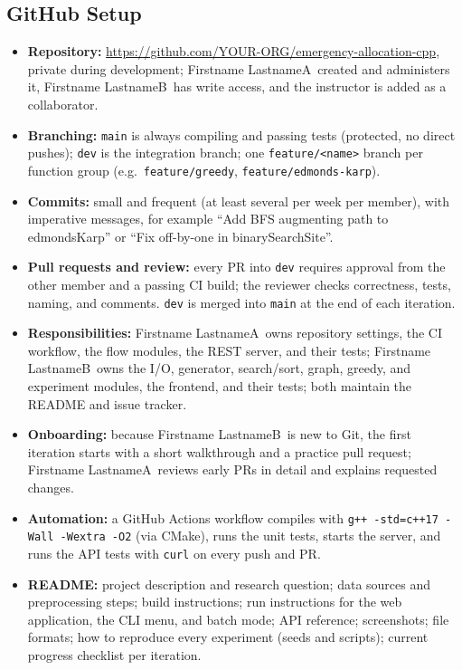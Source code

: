\documentclass[11pt]{article}
\newcommand{\nameA}{Firstname LastnameA}
\newcommand{\nameB}{Firstname LastnameB}
\newcommand{\repo}{https://github.com/YOUR-ORG/emergency-allocation-cpp}
\begin{document}
\subsection{GitHub Setup}
\begin{itemize}
  \item \textbf{Repository:} \url{\repo}, private during development;
        \nameA\ created and administers it, \nameB\ has write access, and
        the instructor is added as a collaborator.
  \item \textbf{Branching:} \texttt{main} is always compiling and passing
        tests (protected, no direct pushes); \texttt{dev} is the integration
        branch; one \texttt{feature/<name>} branch per function group (e.g.\
        \texttt{feature/greedy}, \texttt{feature/edmonds-karp}).
  \item \textbf{Commits:} small and frequent (at least several per week per
        member), with imperative messages, for example ``Add BFS augmenting path to
        edmondsKarp'' or ``Fix off-by-one in binarySearchSite''.
  \item \textbf{Pull requests and review:} every PR into \texttt{dev}
        requires approval from the other member and a passing CI build; the
        reviewer checks correctness, tests, naming, and comments.
        \texttt{dev} is merged into \texttt{main} at the end of each
        iteration.
  \item \textbf{Responsibilities:} \nameA\ owns repository settings, the
        CI workflow, the flow modules, the REST server, and their tests;
        \nameB\ owns the I/O, generator, search/sort, graph, greedy, and
        experiment modules, the frontend, and their tests; both maintain the
        README and issue tracker.
  \item \textbf{Onboarding:} because \nameB\ is new to Git, the first
        iteration starts with a short walkthrough and a practice pull request;
        \nameA\ reviews early PRs in detail and explains requested changes.
  \item \textbf{Automation:} a GitHub Actions workflow compiles with
        \texttt{g++ -std=c++17 -Wall -Wextra -O2} (via CMake), runs the unit
        tests, starts the server, and runs the API tests with \texttt{curl} on
        every push and PR.
  \item \textbf{README:} project description and research question; data
        sources and preprocessing steps; build instructions; run instructions
        for the web application, the CLI menu, and batch mode; API reference;
        screenshots; file formats; how to
        reproduce every experiment (seeds and scripts); current progress
        checklist per iteration.
\end{itemize}
\end{document}
